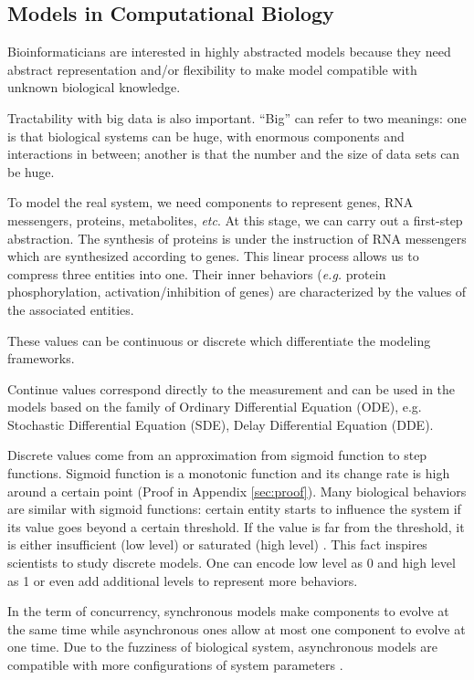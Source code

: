 \subsection{Models in Computational Biology}
Bioinformaticians are interested in highly abstracted models because they need abstract representation and/or flexibility to make model compatible with unknown biological knowledge.

Tractability with big data is also important.
``Big'' can refer to two meanings: one is that biological systems can be huge, with enormous components and interactions in between; another is that the number and the size of data sets can be huge.

To model the real system, we need components to represent genes, RNA messengers, proteins, metabolites, \textit{etc}.
At this stage, we can carry out a first-step abstraction.
The synthesis of proteins is under the instruction of RNA messengers which are synthesized according to genes.
This linear process allows us to compress three entities into one.
Their inner behaviors (\textit{e.g.} protein phosphorylation, activation/inhibition of genes) are characterized by the values of the associated entities.

These values can be continuous or discrete which differentiate the modeling frameworks.

Continue values correspond directly to the measurement and can be used in the models based on the family of Ordinary Differential Equation (ODE), e.g. Stochastic Differential Equation (SDE), Delay Differential Equation (DDE).

Discrete values come from an approximation from sigmoid function to step functions. 
Sigmoid function is a monotonic function and its change rate is high around a certain point (Proof in Appendix \ref{sec:proof}).
Many biological behaviors are similar with sigmoid functions: certain entity starts to influence the system if its value goes beyond a certain threshold.
If the value is far from the threshold, it is either insufficient (low level) or saturated (high level) \cite{kauffman1969,von2000segment}.
This fact inspires scientists to study discrete models.
One can encode low level as 0 and high level as 1 or even add additional levels to represent more behaviors.

In the term of concurrency, synchronous models make components to evolve at the same time while asynchronous ones allow at most one component to evolve at one time.
Due to the fuzziness of biological system, asynchronous models are compatible with more configurations of system parameters \cite{bernot2009}.

